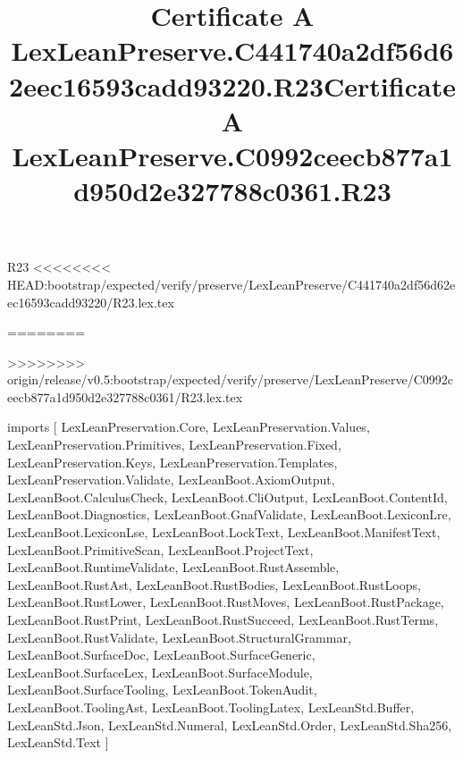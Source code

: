 \begin{lexlean}{R23}
<<<<<<<< HEAD:bootstrap/expected/verify/preserve/LexLeanPreserve/C441740a2df56d62eec16593cadd93220/R23.lex.tex
\title{Certificate A LexLeanPreserve.C441740a2df56d62eec16593cadd93220.R23}
========
\title{Certificate A LexLeanPreserve.C0992ceecb877a1d950d2e327788c0361.R23}
>>>>>>>> origin/release/v0.5:bootstrap/expected/verify/preserve/LexLeanPreserve/C0992ceecb877a1d950d2e327788c0361/R23.lex.tex
\begin{coremodule}
imports [
  LexLeanPreservation.Core,
  LexLeanPreservation.Values,
  LexLeanPreservation.Primitives,
  LexLeanPreservation.Fixed,
  LexLeanPreservation.Keys,
  LexLeanPreservation.Templates,
  LexLeanPreservation.Validate,
  LexLeanBoot.AxiomOutput,
  LexLeanBoot.CalculusCheck,
  LexLeanBoot.CliOutput,
  LexLeanBoot.ContentId,
  LexLeanBoot.Diagnostics,
  LexLeanBoot.GnafValidate,
  LexLeanBoot.LexiconLre,
  LexLeanBoot.LexiconLse,
  LexLeanBoot.LockText,
  LexLeanBoot.ManifestText,
  LexLeanBoot.PrimitiveScan,
  LexLeanBoot.ProjectText,
  LexLeanBoot.RuntimeValidate,
  LexLeanBoot.RustAssemble,
  LexLeanBoot.RustAst,
  LexLeanBoot.RustBodies,
  LexLeanBoot.RustLoops,
  LexLeanBoot.RustLower,
  LexLeanBoot.RustMoves,
  LexLeanBoot.RustPackage,
  LexLeanBoot.RustPrint,
  LexLeanBoot.RustSucceed,
  LexLeanBoot.RustTerms,
  LexLeanBoot.RustValidate,
  LexLeanBoot.StructuralGrammar,
  LexLeanBoot.SurfaceDoc,
  LexLeanBoot.SurfaceGeneric,
  LexLeanBoot.SurfaceLex,
  LexLeanBoot.SurfaceModule,
  LexLeanBoot.SurfaceTooling,
  LexLeanBoot.TokenAudit,
  LexLeanBoot.ToolingAst,
  LexLeanBoot.ToolingLatex,
  LexLeanStd.Buffer,
  LexLeanStd.Json,
  LexLeanStd.Numeral,
  LexLeanStd.Order,
  LexLeanStd.Sha256,
  LexLeanStd.Text
]


\end{coremodule}
\end{lexlean}

